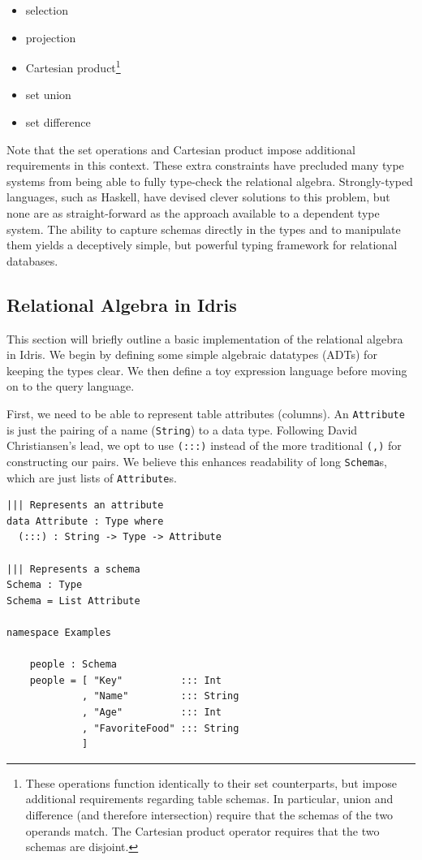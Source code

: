 \documentclass[12pt]{article}
\begin{document}
\begin{itemize}
    \item selection
    \item projection
    \item Cartesian product\footnote{\label{fn:set_ops} These operations function identically to their set counterparts, but impose additional requirements regarding table schemas. In particular, union and difference (and therefore intersection) require that the schemas of the two operands match. The Cartesian product operator requires that the two schemas are disjoint.}
    \item set union\footnotemark[\ref{fn:set_ops}]
    \item set difference\footnotemark[\ref{fn:set_ops}]
\end{itemize}

Note that the set operations and Cartesian product impose additional requirements in this context.
These extra constraints have precluded many type systems from being able to fully type-check the relational algebra.
Strongly-typed languages, such as Haskell, have devised clever solutions to this problem, but none are as straight-forward as the approach available to a dependent type system.
The ability to capture schemas directly in the types and to manipulate them yields a deceptively simple, but powerful typing framework for relational databases.

\subsection{Relational Algebra in Idris}

This section will briefly outline a basic implementation of the relational algebra in Idris.
We begin by defining some simple algebraic datatypes (ADTs) for keeping the types clear.
We then define a toy expression language before moving on to the query language.

First, we need to be able to represent table attributes (columns).
An \texttt{Attribute} is just the pairing of a name (\texttt{String}) to a data type.
Following David Christiansen's lead, we opt to use \texttt{(:::)} instead of the more traditional \texttt{(,)} for constructing our pairs.
We believe this enhances readability of long \texttt{Schema}s, which are just lists of \texttt{Attribute}s.

\begin{lstlisting}
||| Represents an attribute
data Attribute : Type where
  (:::) : String -> Type -> Attribute

||| Represents a schema
Schema : Type
Schema = List Attribute

namespace Examples

    people : Schema
    people = [ "Key"          ::: Int 
             , "Name"         ::: String
             , "Age"          ::: Int
             , "FavoriteFood" ::: String
             ]
\end{lstlisting}
\end{document}

